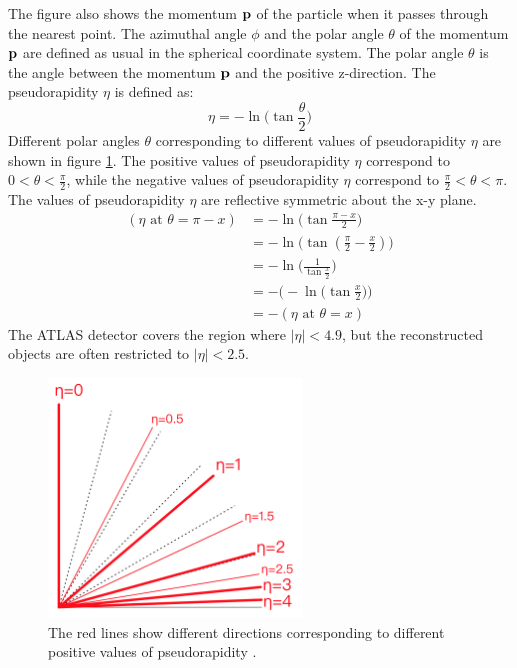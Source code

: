 The figure also shows the momentum $\bf{p}$ of the particle when it passes through the nearest point.
The azimuthal angle $\phi$ and the polar angle $\theta$ of the momentum $\bf{p}$ are defined as usual in the spherical coordinate system.
The polar angle $\theta$ is the angle between the momentum $\bf{p}$ and the positive z-direction.
The pseudorapidity $\eta$ is defined as:
\begin{equation}
\eta = - \ln \Big( \tan \frac{\theta}{2} \Big)
\end{equation}
Different polar angles $\theta$ corresponding to different values of pseudorapidity $\eta$ are shown in figure \ref{fig:pseudorapidity}.
The positive values of pseudorapidity $\eta$ correspond to $0 <\theta< \frac{\pi}{2}$, while the negative values of pseudorapidity $\eta$ correspond to $\frac{\pi}{2} <\theta< \pi$.
The values of pseudorapidity $\eta$ are reflective symmetric about the x-y plane.
\begin{align}
( \eta \text{ at } \theta = \pi - x) &= - \ln \Big( \tan \frac{\pi - x}{2} \Big) \\
&= - \ln \Big( \tan (\frac{\pi}{2} - \frac{x}{2}) \Big) \\
&= - \ln \Big( \frac{1}{ \tan \frac{x}{2} } \Big) \\
&= - \Big( - \ln \Big( \tan \frac{x}{2} \Big) \Big) \\
&= - ( \eta \text{ at } \theta = x)
\end{align}
The ATLAS detector covers the region where $|\eta| < 4.9$, but the reconstructed objects are often restricted to $|\eta| < 2.5$.

\begin{figure}
\centering
\includegraphics[width=0.6\textwidth]{data/photo/detector/pseudorapidity.png}
\caption{The red lines show different directions corresponding to different positive values of pseudorapidity \cite{pseudorapidity}.}
\label{fig:pseudorapidity}
\end{figure}

